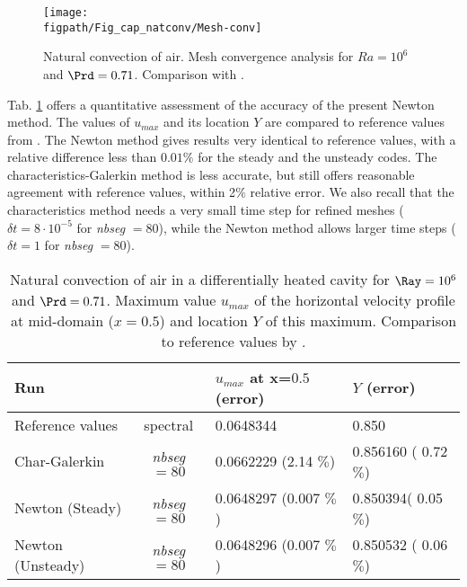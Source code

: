 \begin{figure}
	\begin{center}
		\texttt{[image: \\figpath/Fig\_cap\_natconv/Mesh-conv]} 
	\end{center}
	\caption{Natural convection of air. Mesh convergence analysis for $Ra=10^6$ and $\Prd = 0.71$. Comparison with \cite{LeQuere91}.}
	\label{fig-mesh-analysis}
\end{figure}


Tab. \ref{tab-valid-natconv} offers a quantitative assessment of the accuracy of the present Newton method. 
The values of $u_{max}$  and its location $Y$ are compared to reference values from \cite{LeQuere91}. 
The Newton method gives results very identical to reference values, with a relative difference less than $0.01 \%$ for the steady and the unsteady codes. 
The characteristics-Galerkin method is less accurate, but still offers reasonable agreement with reference values, within 2$\%$ relative error. 
We also recall that the characteristics method needs a very small time step for refined meshes ($\delta t = 8\cdot 10^{-5}$ for {\em nbseg} $= 80$), while the Newton method allows larger time steps ($\delta t = 1$ for {\em nbseg} $= 80$). %
\begin{table}%
	\begin{center}
		\begin{tabular}{|l|c|l|l|}
			\hline
			\multicolumn{2}{|l|}{Run} & $u_{max}$ at x=$0.5$ (error) & $Y$ (error) \\
			\hline
			Reference values & spectral & 0.0648344           & 0.850 \\ \hline
			Char-Galerkin       & {\em nbseg} $=80$ & 0.0662229 (2.14 $\%$) & 0.856160 ( 0.72 $\%$) \\ \hline
			Newton (Steady)        & {\em nbseg} $=80$ & 0.0648297 (0.007 $\%$) & 0.850394( 0.05 $\%$) \\ \hline
			Newton (Unsteady)        & {\em nbseg} $=80$ & 0.0648296 (0.007 $\%$) & 0.850532 ( 0.06 $\%$) \\ \hline
		\end{tabular}
	\end{center}
	\caption {Natural convection of air in a differentially heated cavity for $\Ray= 10^6$ and $\Prd = 0.71$. Maximum value $u_{max}$ of the horizontal velocity profile at mid-domain ($x=0.5$) and location $Y$ of this maximum. Comparison to reference values by \cite{LeQuere91}.}
	\label{tab-valid-natconv}
\end{table}

